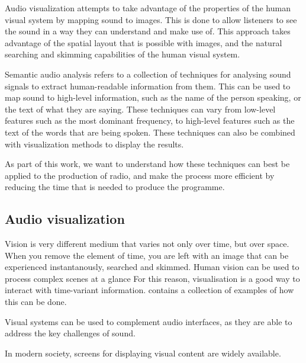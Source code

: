 
Audio visualization attempts to take advantage of the properties of the human visual system by mapping sound to images.
This is done to allow listeners to see the sound in a way they can understand and make use of. This approach takes
advantage of the spatial layout that is possible with images, and the natural searching and skimming capabilities of
the human visual system.

Semantic audio analysis refers to a collection of techniques for analysing sound signals to extract human-readable
information from them. This can be used to map sound to high-level information, such as the name of the person
speaking, or the text of what they are saying. These techniques can vary from low-level features such as the most
dominant frequency, to high-level features such as the text of the words that are being spoken. These techniques can
also be combined with visualization methods to display the results.

As part of this work, we want
to understand how these techniques can best be applied to the production of radio, and make the process more efficient
by reducing the time that is needed to produce the programme. 

\subsection{Audio visualization}

Vision is very different medium that varies not only over time, but over space. When you remove the element of time,
you are left with an image that can be experienced instantanously, searched and skimmed.  Human vision can be used to
process complex scenes at a glance
For this reason, visualisation is a good way to interact with time-variant information.  \citet{Aigner2011} contains a
collection of examples of how this can be done.

Visual systems can be used to complement audio interfaces, as they are able to address the key challenges of sound.

In modern society, screens for displaying visual content are widely available.

